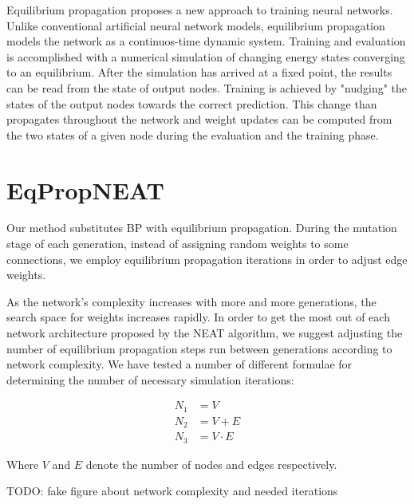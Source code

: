 \documentclass[lettersize,journal]{IEEEtran}
\begin{document}
Equilibrium propagation proposes a new approach to training neural networks. Unlike conventional artificial neural network models, equilibrium propagation models the network as a continuos-time dynamic system. Training and evaluation is accomplished with a numerical simulation of changing energy states converging to an equilibrium. After the simulation has arrived at a fixed point, the results can be read from the state of output nodes. Training is achieved by "nudging" the states of the output nodes towards the correct prediction. This change than propagates throughout the network and weight updates can be computed from the two states of a given node during the evaluation and the training phase.

\section{EqPropNEAT}
Our method substitutes BP with equilibrium propagation. During the mutation stage of each generation, instead of assigning random weights to some connections, we employ equilibrium propagation iterations in order to adjust edge weights. 

As the network's complexity increases with more and more generations, the search space for weights increases rapidly. In order to get the most out of each network architecture proposed by the NEAT algorithm, we suggest adjusting the number of equilibrium propagation steps run between generations according to network complexity. We have tested a number of different formulae for determining the number of necessary simulation iterations:

\begin{align}
  N_1 &= V\\
  N_2 &= V+E\\
  N_3 &= V\cdot E
\end{align}

Where $V$ and $E$ denote the number of nodes and edges respectively.

TODO: fake figure about network complexity and needed iterations

  
  
  
\end{document}
